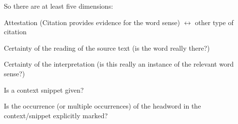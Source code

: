\documentclass[10pt]{article}
\let\tempeone\enumerate
\let\tempetwo\endenumerate
\renewenvironment{enumerate}{\tempeone\setlength\itemsep{-0.5pt}\setlength{\partopsep}{-0.5pt}\setlength{\parsep}{-0.5pt}\setlength{\topsep}{-0.5pt}}{\tempetwo}
\begin{document}
\bigskip
\begin{minipage}{\textwidth}

So there are at least five dimensions:\par


\begin{enumerate}
	\item Attestation (Citation provides evidence for the word sense) $ \leftrightarrow $   other type of citation

	\item  Certainty of the reading of the source text (is the word really there?)

	\item Certainty of the interpretation (is this really an instance of the relevant word sense?)

	\item  Is a context snippet given?

    \item Is the occurrence (or multiple occurrences) of the headword in the context/snippet explicitly marked?
\end{enumerate}
\end{minipage}
\bigskip
\end{document}
